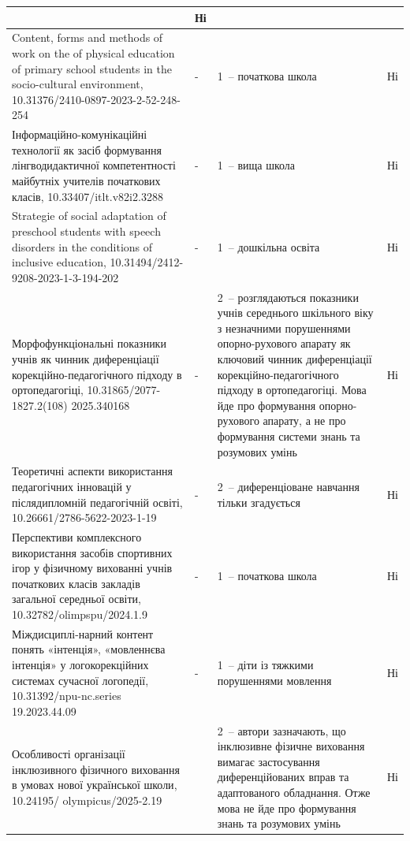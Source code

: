 {\begin{longtable}{|p{}|p{}|p{}|p{}|}
 & 
Ні 
\\
\hline
{Content, forms and methods of work on the of physical education of primary school students in the socio-cultural environment},
10.31376/2410-0897-2023-2-52-248-254
& 
-
& 
1~-- початкова школа
 & 
 Ні
\\
\hline
{Інформаційно-комунікаційні технології як засіб формування лінгводидактичної компетентності майбутніх учителів початкових класів},
10.33407/itlt.v82i2.3288
& 
-
& 
1~-- вища школа
 & 
Ні
\\
\hline
{Strategie of social adaptation of preschool students with speech disorders in the conditions of inclusive education},
10.31494/2412-9208-2023-1-3-194-202
& 
-
& 
1~-- дошкільна освіта
& 
Ні
\\
\hline
{\small Морфофункціональні показники учнів як чинник диференціації корекційно-педагогічного підходу в ортопедагогіці},
10.31865/2077-1827.2(108) 2025.340168
& 
- 
& 
 2~-- розглядаються показники учнів середнього шкільного віку з незначними порушеннями опорно-рухового апарату як ключовий чинник диференціації корекційно-педагогічного підходу в ортопедагогіці. Мова йде про формування опорно-рухового апарату, а не про формування системи знань та розумових умінь

 & 
Ні
\\
\hline
{Теоретичні аспекти використання педагогічних інновацій у післядипломній педагогічній освіті},
10.26661/2786-5622-2023-1-19
& 
-
& 
2~-- диференціоване навчання тільки згадується
 & 
Ні 
\\
\hline
{Перспективи комплексного використання засобів спортивних ігор у фізичному вихованні учнів початкових класів закладів загальної середньої освіти},
10.32782/olimpspu/2024.1.9
& 
-
& 
1~-- початкова школа 
& 
Ні
\\
\hline
{Міждисциплі-нарний контент понять «інтенція», «мовленнєва інтенція» у логокорекційних системах сучасної логопедії},
10.31392/npu-nc.series 19.2023.44.09
& 
-
& 
1~-- діти із тяжкими порушеннями мовлення
 & 
 Ні
\\
\hline
{Особливості організації інклюзивного фізичного виховання в умовах нової української школи},
10.24195/ olympicus/2025-2.19
& 

 & 
2~-- автори зазначають, що інклюзивне фізичне виховання вимагає застосування диференційованих вправ та адаптованого обладнання. Отже мова не йде про формування знань та розумових умінь 
 &
 Ні
\\
\hline
\end{longtable}
}

